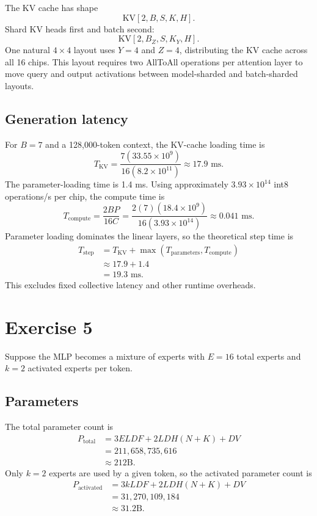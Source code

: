 \documentclass[11pt]{article}
\begin{document}
The KV cache has shape
\[
\mathrm{KV}[2,B,S,K,H].
\]
Shard KV heads first and batch second:
\[
\mathrm{KV}[2,B_Z,S,K_Y,H].
\]
One natural $4\times4$ layout uses $Y=4$ and $Z=4$, distributing the KV
cache across all 16 chips. This layout requires two AllToAll operations per
attention layer to move query and output activations between model-sharded
and batch-sharded layouts.

\subsection*{Generation latency}

For $B=7$ and a 128,000-token context, the KV-cache loading time is
\[
T_{\mathrm{KV}}
=\frac{7(33.55\times10^9)}
{16(8.2\times10^{11})}
\approx17.9\text{ ms}.
\]
The parameter-loading time is 1.4 ms. Using approximately
$3.93\times10^{14}$ int8 operations/s per chip, the compute time is
\[
T_{\mathrm{compute}}
=\frac{2BP}{16C}
=\frac{2(7)(18.4\times10^9)}
{16(3.93\times10^{14})}
\approx0.041\text{ ms}.
\]
Parameter loading dominates the linear layers, so the theoretical step time is
\begin{align*}
T_{\mathrm{step}}
&=T_{\mathrm{KV}}
  +\max(T_{\mathrm{parameters}},T_{\mathrm{compute}})\\
&\approx17.9+1.4\\
&=\boxed{19.3\text{ ms}}.
\end{align*}
This excludes fixed collective latency and other runtime overheads.

\section*{Exercise 5}

Suppose the MLP becomes a mixture of experts with $E=16$ total experts and
$k=2$ activated experts per token.

\subsection*{Parameters}

The total parameter count is
\begin{align*}
P_{\mathrm{total}}
&=3ELDF+2LDH(N+K)+DV\\
&=211{,}658{,}735{,}616\\
&\approx\boxed{212\text{B}}.
\end{align*}
Only $k=2$ experts are used by a given token, so the activated parameter count
is
\begin{align*}
P_{\mathrm{activated}}
&=3kLDF+2LDH(N+K)+DV\\
&=31{,}270{,}109{,}184\\
&\approx\boxed{31.2\text{B}}.
\end{align*}
\end{document}
